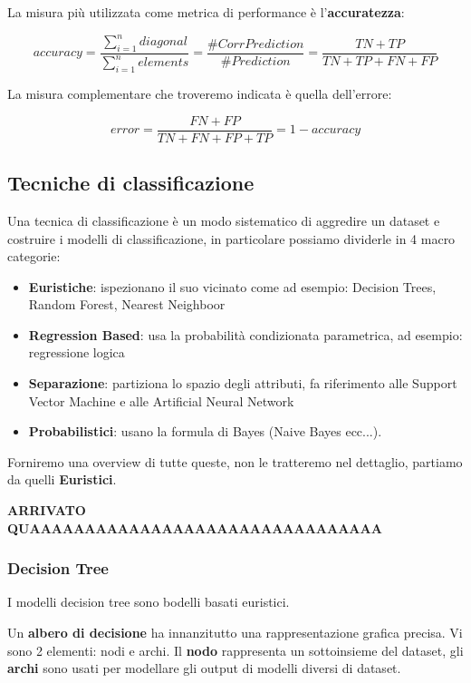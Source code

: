 \begin{defn}
	La misura più utilizzata come metrica di performance è l'\textbf{accuratezza}:
	
	\[accuracy = \frac{\sum_{i = 1}^{n} diagonal}{\sum_{i=1}^{n}elements} = \frac{\#CorrPrediction}{\#Prediction} = \frac{TN + TP}{TN + TP + FN + FP}\] 
	
	La misura complementare che troveremo indicata è quella dell'errore:
	
	\[error = \frac{FN + FP}{TN + FN + FP + TP} =  1 - accuracy\]
\end{defn}

\subsection{Tecniche di classificazione}

Una tecnica di classificazione è un modo sistematico di aggredire un dataset e costruire i modelli di classificazione, in particolare possiamo dividerle in 4 macro categorie:
\begin{itemize}
	\item \textbf{Euristiche}: ispezionano il suo vicinato come ad esempio: Decision Trees, Random Forest, Nearest Neighboor
	\item \textbf{Regression Based}: usa la probabilità condizionata parametrica, ad esempio: regressione logica
	\item \textbf{Separazione}: partiziona lo spazio degli attributi, fa riferimento alle Support Vector Machine e alle Artificial Neural Network
	\item \textbf{Probabilistici}: usano la formula di Bayes (Naive Bayes ecc...).
\end{itemize}

Forniremo una overview di tutte queste, non le tratteremo nel dettaglio, partiamo da quelli \textbf{Euristici}.

\textbf{ARRIVATO QUAAAAAAAAAAAAAAAAAAAAAAAAAAAAAAAA}

\subsubsection{Decision Tree}
I modelli decision tree sono bodelli basati euristici. 

Un \textbf{albero di decisione} ha innanzitutto una rappresentazione grafica precisa. Vi sono 2 elementi: nodi e archi. Il \textbf{nodo} rappresenta un sottoinsieme del dataset, gli \textbf{archi} sono usati per modellare gli output di modelli diversi di dataset.

